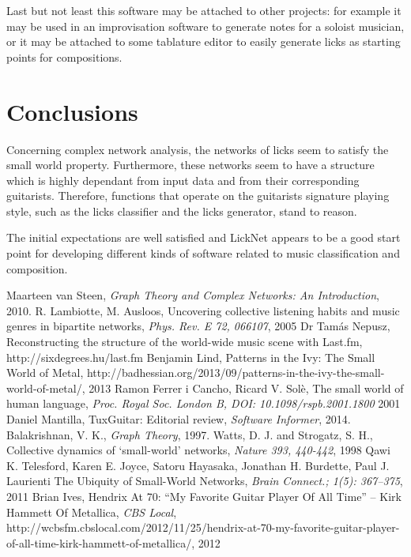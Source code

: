 \documentclass{llncs}
\begin{document}
Last but not least this software may be attached to other projects: for example it may be used 
in an improvisation software to generate notes for a 
soloist musician, or it may be attached to some tablature editor to easily
generate licks as starting points for compositions.

\section{Conclusions}
Concerning complex network analysis, the networks of licks seem to satisfy the small
world property. Furthermore, these networks seem to have a
structure which is highly dependant from input data and from their corresponding guitarists. 
Therefore, functions that operate on the guitarists signature playing style, such as the
licks classifier and the licks generator, stand to reason.

The initial expectations are well satisfied and LickNet appears to be a
good start point for developing different kinds of software related to
music classification and composition.

\begin{thebibliography}{50}
		Maarteen van Steen, 
		\textsl{Graph Theory and Complex Networks: An Introduction}, 
		2010.
		R. Lambiotte, M. Ausloos,
		Uncovering collective listening habits and music genres in bipartite networks,
		\textsl{Phys. Rev. E 72, 066107},
		2005
		Dr Tamás Nepusz,
		Reconstructing the structure of the world-wide music scene with Last.fm,
		http://sixdegrees.hu/last.fm
		Benjamin Lind,
		Patterns in the Ivy: The Small World of Metal,
		http://badhessian.org/2013/09/patterns-in-the-ivy-the-small-world-of-metal/,
		2013
		Ramon Ferrer i Cancho, Ricard V. Solè,
		The small world of human language,
		\textsl{Proc. Royal Soc. London B, DOI: 10.1098/rspb.2001.1800}
		2001
		Daniel Mantilla,
		TuxGuitar: Editorial review,
		\textsl{Software Informer},
		2014.
		Balakrishnan, V. K.,
		\textsl{Graph Theory},
		1997.
		Watts, D. J. and Strogatz, S. H.,
		Collective dynamics of `small-world’ networks,
		\textsl{Nature 393, 440-442},
		1998
		Qawi K. Telesford, Karen E. Joyce, Satoru Hayasaka, Jonathan H. Burdette, Paul J. Laurienti
		The Ubiquity of Small-World Networks,
		\textsl{Brain Connect.; 1(5): 367–375},
		2011
		Brian Ives,
		Hendrix At 70: “My Favorite Guitar Player Of All Time” – Kirk Hammett Of Metallica,
		\textsl{CBS Local},
		http://wcbsfm.cbslocal.com/2012/11/25/hendrix-at-70-my-favorite-guitar-player-of-all-time-kirk-hammett-of-metallica/,
		2012
	\end{thebibliography}
\end{document}
